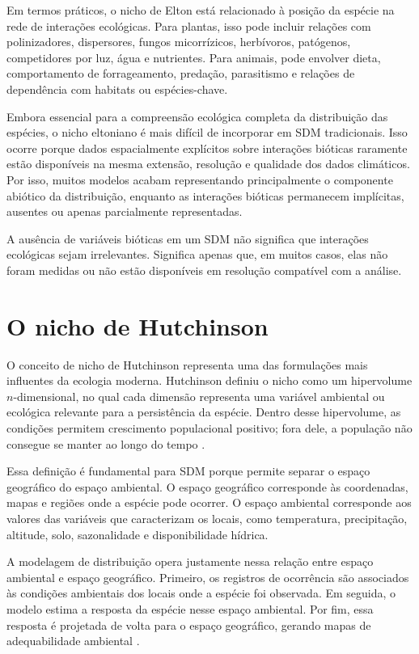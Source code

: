 Em termos práticos, o nicho de Elton está relacionado à posição da espécie na rede de interações ecológicas. Para plantas, isso pode incluir relações com polinizadores, dispersores, fungos micorrízicos, herbívoros, patógenos, competidores por luz, água e nutrientes. Para animais, pode envolver dieta, comportamento de forrageamento, predação, parasitismo e relações de dependência com habitats ou espécies-chave.

Embora essencial para a compreensão ecológica completa da distribuição das espécies, o nicho eltoniano é mais difícil de incorporar em SDM tradicionais. Isso ocorre porque dados espacialmente explícitos sobre interações bióticas raramente estão disponíveis na mesma extensão, resolução e qualidade dos dados climáticos. Por isso, muitos modelos acabam representando principalmente o componente abiótico da distribuição, enquanto as interações bióticas permanecem implícitas, ausentes ou apenas parcialmente representadas.

\begin{atencao}[title={\faExclamationTriangle\quad atenção}]
A ausência de variáveis bióticas em um SDM não significa que interações ecológicas sejam irrelevantes. Significa apenas que, em muitos casos, elas não foram medidas ou não estão disponíveis em resolução compatível com a análise.
\end{atencao}

\section{O nicho de Hutchinson}

O conceito de nicho de Hutchinson representa uma das formulações mais influentes da ecologia moderna. Hutchinson definiu o nicho como um hipervolume $n$-dimensional, no qual cada dimensão representa uma variável ambiental ou ecológica relevante para a persistência da espécie. Dentro desse hipervolume, as condições permitem crescimento populacional positivo; fora dele, a população não consegue se manter ao longo do tempo \parencite{hutchinson1957,colwell2009}.

Essa definição é fundamental para SDM porque permite separar o espaço geográfico do espaço ambiental. O espaço geográfico corresponde às coordenadas, mapas e regiões onde a espécie pode ocorrer. O espaço ambiental corresponde aos valores das variáveis que caracterizam os locais, como temperatura, precipitação, altitude, solo, sazonalidade e disponibilidade hídrica.

A modelagem de distribuição opera justamente nessa relação entre espaço ambiental e espaço geográfico. Primeiro, os registros de ocorrência são associados às condições ambientais dos locais onde a espécie foi observada. Em seguida, o modelo estima a resposta da espécie nesse espaço ambiental. Por fim, essa resposta é projetada de volta para o espaço geográfico, gerando mapas de adequabilidade ambiental \parencite{guisan2017habitat,raes2018modeling}.

